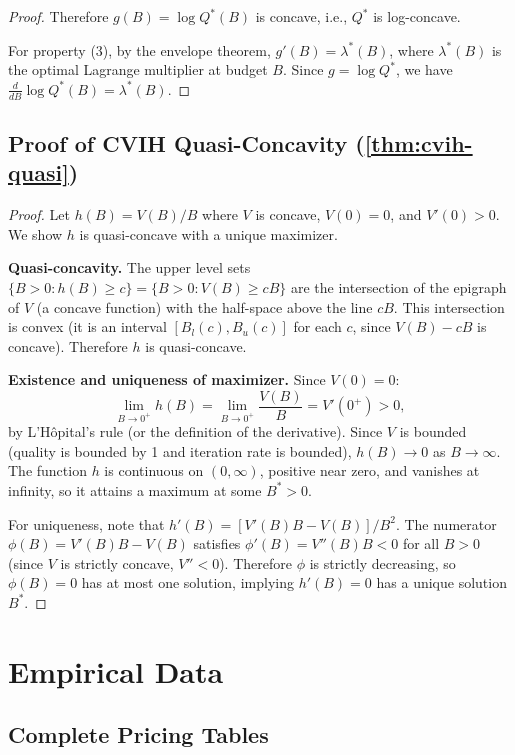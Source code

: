 \documentclass[11pt, a4paper, copyright]{googledeepmind}
\begin{document}
\begin{appendices}
\begin{proof}
Therefore $g(B) = \log Q^*(B)$ is concave, i.e., $Q^*$ is log-concave.

For property (3), by the envelope theorem, $g'(B) = \lambda^*(B)$, where $\lambda^*(B)$ is the optimal Lagrange multiplier at budget $B$. Since $g = \log Q^*$, we have $\frac{d}{dB}\log Q^*(B) = \lambda^*(B)$.
\end{proof}

\subsection{Proof of CVIH Quasi-Concavity (\texorpdfstring{\cref{thm:cvih-quasi}}{Theorem 7.2})}

\begin{proof}
Let $h(B) = V(B)/B$ where $V$ is concave, $V(0) = 0$, and $V'(0) > 0$. We show $h$ is quasi-concave with a unique maximizer.

\textbf{Quasi-concavity.} The upper level sets $\{B > 0 : h(B) \geq c\} = \{B > 0 : V(B) \geq cB\}$ are the intersection of the epigraph of $V$ (a concave function) with the half-space above the line $cB$. This intersection is convex (it is an interval $[B_l(c), B_u(c)]$ for each $c$, since $V(B) - cB$ is concave). Therefore $h$ is quasi-concave.

\textbf{Existence and uniqueness of maximizer.} Since $V(0) = 0$:
\[
    \lim_{B \to 0^+} h(B) = \lim_{B \to 0^+} \frac{V(B)}{B} = V'(0^+) > 0,
\]
by L'H\^{o}pital's rule (or the definition of the derivative). Since $V$ is bounded (quality is bounded by 1 and iteration rate is bounded), $h(B) \to 0$ as $B \to \infty$. The function $h$ is continuous on $(0,\infty)$, positive near zero, and vanishes at infinity, so it attains a maximum at some $B^* > 0$.

For uniqueness, note that $h'(B) = [V'(B)B - V(B)]/B^2$. The numerator $\phi(B) = V'(B)B - V(B)$ satisfies $\phi'(B) = V''(B)B < 0$ for all $B > 0$ (since $V$ is strictly concave, $V'' < 0$). Therefore $\phi$ is strictly decreasing, so $\phi(B) = 0$ has at most one solution, implying $h'(B) = 0$ has a unique solution $B^*$.
\end{proof}


\section{Empirical Data}\label{app:empirical}

\subsection{Complete Pricing Tables}


\end{appendices}
\end{document}
